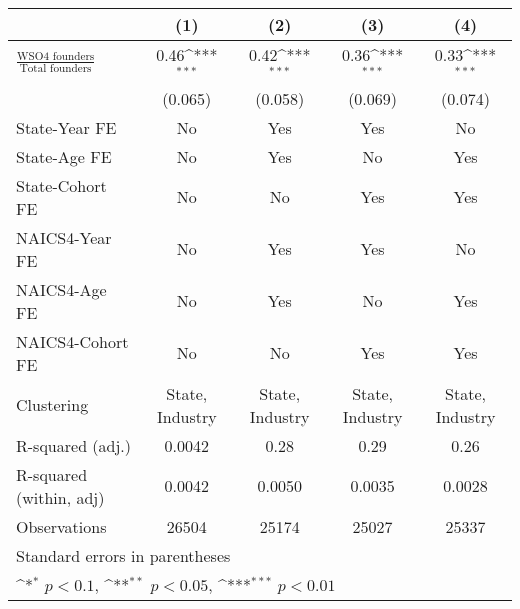 {
\def\sym#1{\ifmmode^{#1}\else\(^{#1}\)\fi}
\begin{tabular}{l*{4}{c}}
\toprule
                    &\multicolumn{1}{c}{(1)}         &\multicolumn{1}{c}{(2)}         &\multicolumn{1}{c}{(3)}         &\multicolumn{1}{c}{(4)}         \\
\midrule
$\frac{\text{WSO4 founders}}{\text{Total founders}}$&        0.46\sym{***}&        0.42\sym{***}&        0.36\sym{***}&        0.33\sym{***}\\
                    &     (0.065)         &     (0.058)         &     (0.069)         &     (0.074)         \\
\addlinespace
State-Year FE       &          No         &         Yes         &         Yes         &          No         \\
\addlinespace
State-Age FE        &          No         &         Yes         &          No         &         Yes         \\
\addlinespace
State-Cohort FE     &          No         &          No         &         Yes         &         Yes         \\
\addlinespace
NAICS4-Year FE      &          No         &         Yes         &         Yes         &          No         \\
\addlinespace
NAICS4-Age FE       &          No         &         Yes         &          No         &         Yes         \\
\addlinespace
NAICS4-Cohort FE    &          No         &          No         &         Yes         &         Yes         \\
\midrule
Clustering          &State, Industry         &State, Industry         &State, Industry         &State, Industry         \\
R-squared (adj.)    &      0.0042         &        0.28         &        0.29         &        0.26         \\
R-squared (within, adj)&      0.0042         &      0.0050         &      0.0035         &      0.0028         \\
Observations        &       26504         &       25174         &       25027         &       25337         \\
\bottomrule
\multicolumn{5}{l}{\footnotesize Standard errors in parentheses}\\
\multicolumn{5}{l}{\footnotesize \sym{*} \(p<0.1\), \sym{**} \(p<0.05\), \sym{***} \(p<0.01\)}\\
\end{tabular}
}
